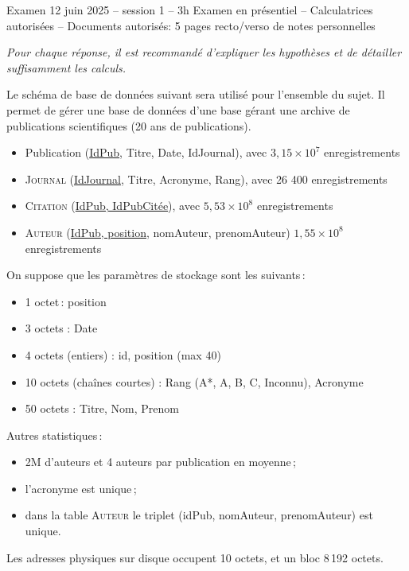 %
{Examen 12 juin 2025 -- session 1 -- 3h}%
{Examen en présentiel -- Calculatrices autorisées -- Documents autorisés: 5 pages recto/verso de notes personnelles}%

\textit{Pour chaque réponse, il est recommandé d'expliquer les hypothèses et de détailler
suffisamment les calculs.}

\bigskip
Le sch\'ema de base de donn\'ees suivant sera utilis\'e pour l'ensemble du
sujet. Il permet de gérer une base de données d'une base gérant une archive de publications scientifiques (20 ans de publications).

\begin{itemize}
\item {\sc Publication} (\underline{IdPub}, Titre, Date, IdJournal), avec $3,15 \times 10^7$ enregistrements
\item \textsc{Journal}  (\underline{IdJournal}, Titre, Acronyme, Rang), avec  26 400 enregistrements
\item  \textsc{Citation}  (\underline{IdPub, IdPubCitée}), avec $5,53 \times 10^8$ enregistrements
\item  \textsc{Auteur}  (\underline{IdPub, position}, nomAuteur, prenomAuteur)  $1,55 \times 10^8$ enregistrements
\end{itemize}

\smallskip

On suppose que les paramètres de stockage sont les suivants\,:
\begin{itemize}
  \item 1 octet\,: position
	\item 3 octets : Date
	\item 4 octets (entiers) : id, position (max 40)
	\item 10 octets (chaînes courtes) : Rang (A*, A, B, C, Inconnu), Acronyme
	\item 50 octets : Titre, Nom, Prenom
\end{itemize}


Autres statistiques\,:
\begin{itemize}
	\item 2M d'auteurs et 4 auteurs par publication en moyenne\,;
	\item l'acronyme est unique\,;
	\item dans la table \textsc{Auteur} le triplet (idPub, nomAuteur, prenomAuteur) est unique.
\end{itemize}

Les adresses physiques sur disque occupent 10 octets, et un bloc 8\,192 octets.

